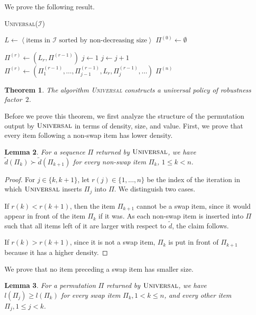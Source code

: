 \documentclass[11pt]{article}
\newcommand{\noun}[1]{\textsc{#1}}
\newtheorem{theorem}{Theorem}
\newtheorem{lemma}[theorem]{Lemma}
\newcommand{\I}{\mathcal{I}}
\begin{document}
We prove the following result.

\begin{algorithm}[tb]   
  \DontPrintSemicolon 
  \KwIn{set of items $\I$} 
  \caption{\textsc{Universal}($\mathcal{I}$)\label{our_algo}}
 
  $L \leftarrow \left<\text{items in }\mathcal{I}\text{ sorted by non-decreasing size}\right>$\;
  $\Pi^{(0)} \leftarrow \emptyset$\;
  
  {     
    {$\Pi^{(r)} \leftarrow (L_r,\Pi^{(r-1)})$\;}     
    \Else     
    {       
      $j \leftarrow 1$\;       
      { $j \leftarrow j+1$\; }       
      $\Pi^{(r)} \leftarrow (\Pi^{(r-1)}_1,\dots,\Pi^{(r-1)}_{j-1},L_r,\Pi^{(r-1)}_j,\dots)$\;     
    }   
  }
  \Return $\Pi^{(n)}$\; 
\end{algorithm}
\begin{theorem}
The algorithm \noun{Universal} constructs a universal policy of robustness
factor~$2$. \label{thm:2-competitive} 
\end{theorem}
Before we prove this theorem, we first analyze the structure of the
permutation output by $\textsc{Universal}$ in terms of density, size,
and value. First, we prove that every item following a non-swap item
has lower density.
\begin{lemma}
For a sequence $\Pi$ returned by $\textsc{Universal}$, we have $\tilde{d}(\Pi_{k})\succ\tilde{d}(\Pi_{k+1})$
for every non-swap item $\Pi_{k}$, $1\leq k<n$. \label{lem:densities} \end{lemma}
\begin{proof}
For $j\in\{k,k+1\}$, let $r(j)\in\{1,\dots,n\}$ be the index of
the iteration in which $\textsc{Universal}$ inserts $\Pi_{j}$ into
$\Pi$. We distinguish two cases.

If $r(k)<r(k+1)$, then the item $\Pi_{k+1}$ cannot be a swap item,
since it would appear in front of the item $\Pi_{k}$ if it was. As
each non-swap item is inserted into $\Pi$ such that all items left
of it are larger with respect to $\tilde{d}$, the claim follows.

If $r(k)>r(k+1)$, since it is not a swap item, $\Pi_{k}$ is put
in front of $\Pi_{k+1}$ because it has a higher density.  
\end{proof}
We prove that no item preceding a swap item has smaller size.
\begin{lemma}
For a permutation $\Pi$ returned by $\textsc{Universal}$, we have
$l(\Pi_{j})\geq l(\Pi_{k})$ for every swap item $\Pi_{k},1<k\leq n$,
and every other item $\Pi_{j},1\leq j<k$. \label{lem:sizes} \end{lemma}
\end{document}

